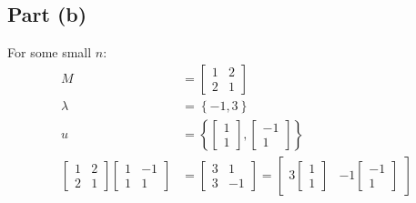 \documentclass{article}
\begin{document}
\subsection*{Part (b)}
For some small $n$:
\begin{equation}
    \begin{split}
        M & = \begin{bmatrix}
            1 & 2 \\ 2 & 1
        \end{bmatrix} \\
        \lambda & = \left\{ -1, 3 \right\} \\
        u & = \left\{ \begin{bmatrix}
            1 \\ 1
        \end{bmatrix},  \begin{bmatrix}
            -1 \\ 1
        \end{bmatrix} \right\} \\
        \begin{bmatrix}
            1 & 2 \\ 2 & 1
        \end{bmatrix}\begin{bmatrix}
            1 & -1 \\ 1 & 1
        \end{bmatrix} & = \begin{bmatrix}
            3 & 1 \\ 3 & -1
        \end{bmatrix} = \begin{bmatrix}
            3\begin{bmatrix}
            1 \\ 1
        \end{bmatrix} & -1\begin{bmatrix}
            -1 \\ 1
        \end{bmatrix}
        \end{bmatrix}
    \end{split}
\end{equation}
\end{document}
